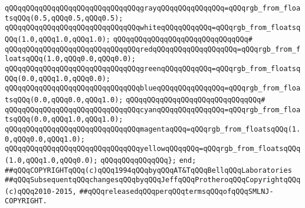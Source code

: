 \verb|qQQqqQQqqQQqqQQqqQQqqQQqqQQqqQQqgrayqQQqqQQqqQQqqQQq=qQQqrgb_from_floatsqQQq(0.5,qQQq0.5,qQQq0.5);|\newline
\verb|qQQqqQQqqQQqqQQqqQQqqQQqqQQqqQQqwhiteqQQqqQQqqQQq=qQQqrgb_from_floatsqQQq(1.0,qQQq1.0,qQQq1.0);|\newline
\verb|qQQqqQQqqQQqqQQqqQQqqQQqqQQqqQQq#|\newline
\verb|qQQqqQQqqQQqqQQqqQQqqQQqqQQqqQQqredqQQqqQQqqQQqqQQqqQQq=qQQqrgb_from_floatsqQQq(1.0,qQQq0.0,qQQq0.0);|\newline
\verb|qQQqqQQqqQQqqQQqqQQqqQQqqQQqqQQqgreenqQQqqQQqqQQq=qQQqrgb_from_floatsqQQq(0.0,qQQq1.0,qQQq0.0);|\newline
\verb|qQQqqQQqqQQqqQQqqQQqqQQqqQQqqQQqblueqQQqqQQqqQQqqQQq=qQQqrgb_from_floatsqQQq(0.0,qQQq0.0,qQQq1.0);|\newline
\verb|qQQqqQQqqQQqqQQqqQQqqQQqqQQqqQQq#|\newline
\verb|qQQqqQQqqQQqqQQqqQQqqQQqqQQqqQQqcyanqQQqqQQqqQQqqQQq=qQQqrgb_from_floatsqQQq(0.0,qQQq1.0,qQQq1.0);|\newline
\verb|qQQqqQQqqQQqqQQqqQQqqQQqqQQqqQQqmagentaqQQq=qQQqrgb_from_floatsqQQq(1.0,qQQq0.0,qQQq1.0);|\newline
\verb|qQQqqQQqqQQqqQQqqQQqqQQqqQQqqQQqyellowqQQqqQQq=qQQqrgb_from_floatsqQQq(1.0,qQQq1.0,qQQq0.0);|\newline
\verb|qQQqqQQqqQQqqQQq};|\newline
\verb|end;|\newline
\newline
\verb|##qQQqCOPYRIGHTqQQq(c)qQQq1994qQQqbyqQQqAT&TqQQqBellqQQqLaboratories|\newline
\verb|##qQQqSubsequentqQQqchangesqQQqbyqQQqJeffqQQqProtheroqQQqCopyrightqQQq(c)qQQq2010-2015,|\newline
\verb|##qQQqreleasedqQQqperqQQqtermsqQQqofqQQqSMLNJ-COPYRIGHT.|\newline

